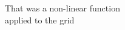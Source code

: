 \documentclass[preview]{standalone}
\begin{document}
\begin{center}
That was a non-linear function \\ applied to the grid
\end{center}
\end{document}
